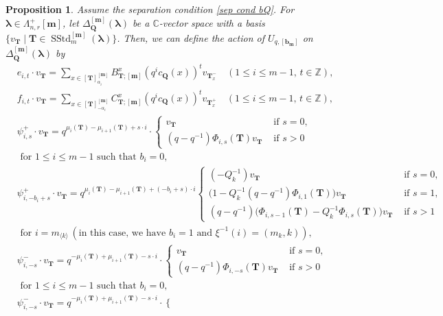 \documentclass[12pt]{amsart}
\newtheorem{prop}[thm]{Proposition}
\numberwithin{equation}{thm}
\newcommand\CC{\mathbb C}
\newcommand\ZZ{\mathbb Z}
\newcommand\bQ{\mathbf Q}
\newcommand\bT{\mathbf T}
\newcommand\bb{\mathbf b}
\renewcommand\bm{\mathbf m} %
\renewcommand\a{\alpha}  %
\newcommand\D{\Delta}
\newcommand\vL{\varLambda}
\newcommand\Bla{\boldsymbol\lambda}
\newcommand\lan{\langle}
\newcommand\ran{\rangle}
\newcommand{\SStd}{\operatorname{SStd}}
\begin{document}
\begin{prop}
Assume the separation condition \eqref{sep cond bQ}. 
For $\Bla \in \vL_{n,r}^+[\bm]$, 
let $\D_{\bQ}^{[\bm]}(\Bla)$ be a $\CC$-vector space with a basis $\{ v_{\bT} \mid \bT \in \SStd_m^{[\bm]} (\Bla)\}$. 
Then, we can define the action of $U_{q,[\bb_{\bm}]}$ on $\D_{\bQ}^{[\bm]} (\Bla)$ by 
\begin{align*}
& e_{i,t} \cdot v_{\bT} = \sum_{ x \in [\bT]_{\a_i}^{[\bm]}} B_{\bT ; [\bm]}^x (q^i c_{\bQ}(x))^t v_{\bT_x^-} 
	\quad (1 \leq i \leq m-1, \, t \in \ZZ), 
\\
& f_{i,t} \cdot v_{\bT} = \sum_{x \in [\bT]_{-\a_i}^{[\bm]}} C_{\bT;[\bm]}^x (q^i c_{\bQ} (x))^t v_{\bT_x^+} 
	\quad ( 1 \leq i \leq m-1, \,  t \in \ZZ), 
\\
& \psi_{i,s}^+ \cdot v_{\bT} = q^{\mu_i(\bT) - \mu_{i+1} (\bT) + s \cdot i} 
	\cdot 
	\begin{cases}
	v_{\bT} 
		& \text{ if }  s=0, 
	\\
	(q-q^{-1}) \Phi_{i,s} (\bT) v_{\bT} 
		& \text{ if }  s >0 
	\end{cases}
	\\ & \text{ for } 1 \leq i \leq m-1 \text{ such that } b_i =0, 
%	
\\ 
&\psi_{i, - b_i +s}^+ \cdot v_{\bT} = q^{\mu_i(\bT) - \mu_{i+1} (\bT) + (-b_i +s) \cdot i} 
	\begin{cases}
		(- Q_k^{-1}) v_{\bT} 
			& \text{ if }  s=0, 
		\\ 
		\big( 1 - Q_k^{-1} (q-q^{-1}) \Phi_{i,1} (\bT) \big) v_{\bT} 
			& \text{ if } s=1, 
		\\
		(q-q^{-1} ) \big( \Phi_{i,s-1} (\bT) - Q_k^{-1} \Phi_{i,s} (\bT) \big) v_{\bT} 
			& \text{ if } s >1 
	\end{cases}
	\\ & \text{ for } i=m_{\lan k \ran} \, 
	 ( \text{in this case, we have } b_i=1 \text{ and } \xi^{-1} (i) =(m_k,k)), 
\\
& \psi_{i, -s}^- \cdot v_{\bT} = q^{- \mu_i(\bT) + \mu_{i+1} (\bT) - s \cdot i} 
	\cdot 
	\begin{cases}
		v_{\bT} 
			& \text{ if } s=0, 
		\\
		(q-q^{-1}) \Phi_{i, -s} (\bT) v_{\bT} 
			& \text{ if } s >0
	\end{cases}
	\\ & 
	\text{ for } 1 \leq i \leq m-1 \text{ such that } b_i =0, 
\\
& \psi_{i, -s}^- \cdot v_{\bT} = q^{-\mu_i(\bT) + \mu_{i+1} (\bT) - s \cdot i} 
	\cdot 
	\begin{cases}

\end{cases}
\end{align*}
\end{prop}
\end{document}
